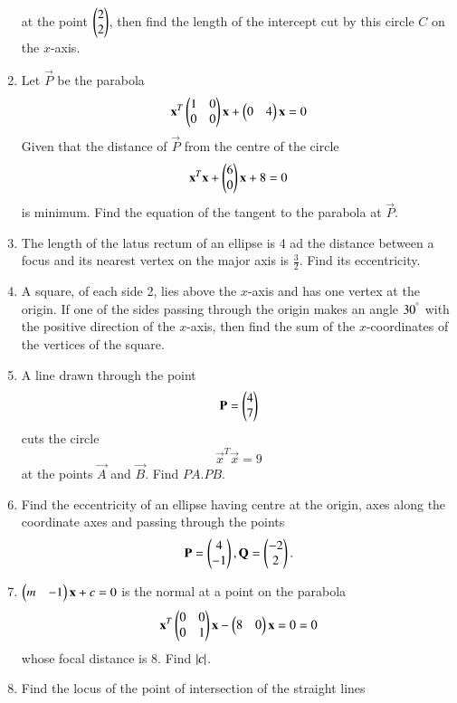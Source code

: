 \documentclass[journal,12pt,twocolumn]{IEEEtran}
\begin{document}
\begin{enumerate}[label=\arabic*.]
%
at the point $\begin{pmatrix}2\\2\end{pmatrix}$, then find the length of the intercept cut by this circle $C$ on the $x$-axis.
\item Let $\vec{P}$ 
be the parabola
\begin{equation}
\mathbf{x}^T\begin{pmatrix}1 & 0 \\ 0 & 0\end{pmatrix}\mathbf{x} +\begin{pmatrix}0 & 4 \end{pmatrix}\mathbf{x} 
 = 0
\end{equation}
Given that the distance of $\vec{P}$ from the centre of the circle
\begin{equation}
\mathbf{x}^T\mathbf{x} +\begin{pmatrix}6 \\ 0 \end{pmatrix}\mathbf{x} + 8 = 0
\end{equation}
%
is minimum.  Find the equation of the tangent to the parabola at $\vec{P}$.
\item The length of the latus rectum of an ellipse is 4 ad the distance between a focus and its nearest
vertex on the major axis is $\frac{3}{2}$.  Find its eccentricity.
\item A square, of each side 2, lies above the $x$-axis and has one vertex at the origin.  If one of the sides 
passing through the origin makes an angle $30^{\degree}$ with the positive direction of the $x$-axis, then 
find the 
sum of the $x$-coordinates of the vertices of the square.
\item A line drawn through the point 
\begin{equation}
\mathbf{P} = \begin{pmatrix}4\\7\end{pmatrix} 
\end{equation}
cuts the circle
\begin{equation}
\vec{x}^T\vec{x}  = 9
\end{equation}
at the points $\vec{A}$ and $\vec{B}$. Find $PA.PB$.
\item Find the eccentricity of an ellipse having centre at the origin, axes along the coordinate axes and 
passing through the points 
\begin{equation}
\mathbf{P} = \begin{pmatrix}4\\-1\end{pmatrix}, 
\mathbf{Q} = \begin{pmatrix}-2\\2\end{pmatrix}. 
\end{equation}
\item $\begin{pmatrix}m & -1\end{pmatrix}\mathbf{x} + c =0$ is the normal at a point on the parabola
\begin{equation}
\mathbf{x}^T\begin{pmatrix}0 & 0 \\ 0 & 1\end{pmatrix}\mathbf{x} -\begin{pmatrix}8 & 0 \end{pmatrix}\mathbf{x} = 0
 = 0
\end{equation}
%
whose focal distance is 8.  Find $\left\vert c\right\vert$.
\item Find the locus of the point of intersection of the straight lines

\end{enumerate}
\end{document}
